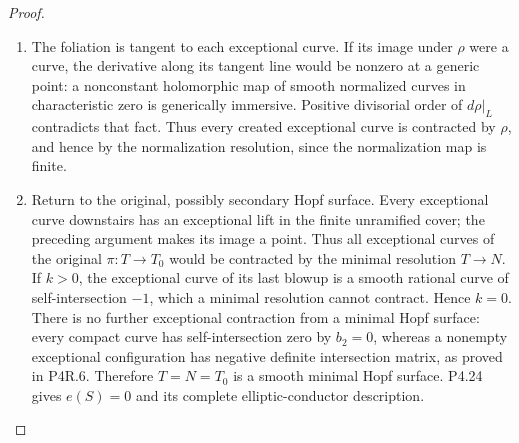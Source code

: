 \begin{proof}
\begin{enumerate}[label={$\langle1\rangle$\arabic*.},leftmargin=*]
\item The foliation is tangent to each exceptional curve.
If its image under $\rho$ were a curve, the derivative
along its tangent line would be nonzero at a generic
point: a nonconstant holomorphic map of smooth
normalized curves in characteristic zero is
generically immersive. Positive divisorial order
of $d\rho|_L$ contradicts that fact. Thus every
created exceptional curve is contracted by $\rho$,
and hence by the normalization resolution, since
the normalization map is finite.

\item Return to the original, possibly secondary Hopf
surface. Every exceptional curve downstairs has
an exceptional lift in the finite unramified cover;
the preceding argument makes its image a point.
Thus all exceptional curves of the original
$\pi:T\to T_0$ would be contracted by the minimal
resolution $T\to N$. If $k>0$, the exceptional curve
of its last blowup is a smooth rational curve of
self-intersection $-1$, which a minimal resolution
cannot contract. Hence $k=0$.
There is no further exceptional contraction from
a minimal Hopf surface: every compact curve has
self-intersection zero by $b_2=0$, whereas a
nonempty exceptional configuration has negative
definite intersection matrix, as proved in P4R.6.
Therefore $T=N=T_0$ is a smooth minimal Hopf
surface. P4.24 gives $e(S)=0$ and its complete
elliptic-conductor description.

\end{enumerate}
\end{proof}

